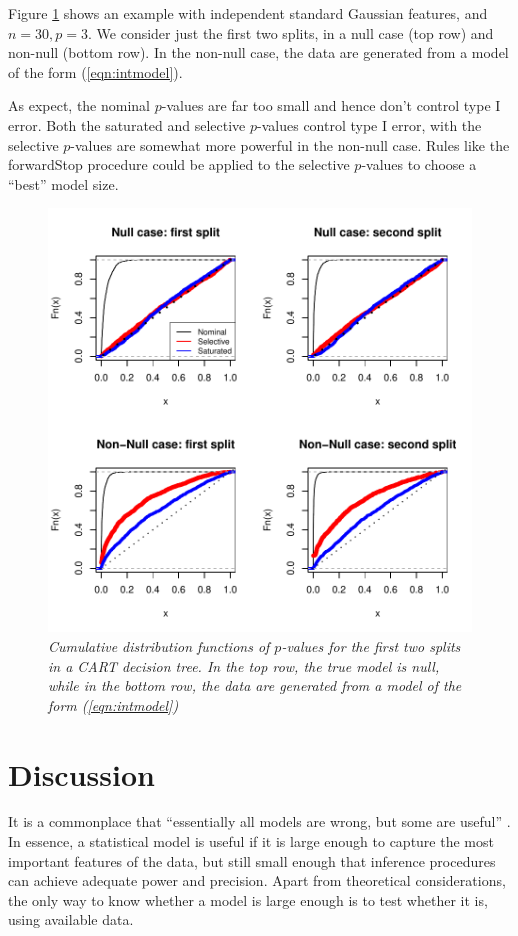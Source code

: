 \documentclass{article}
\begin{document}
Figure \ref{fig:cart} shows an example with independent standard Gaussian features, and $n=30, p=3$.
We 
consider just the first two splits, in a null case (top row) and non-null (bottom row).
In the non-null case,  the data are generated from a  model of the form (\ref{eqn:intmodel}).

As expect, the nominal $p$-values are far too small and hence don't control type I error.
Both the saturated and selective $p$-values control type I error, with the selective $p$-values are somewhat more powerful in the non-null case.
Rules like the forwardStop procedure could be applied  to the selective $p$-values to choose a ``best'' model size.
\begin{figure}[h]
  \centering
  \includegraphics[width=.65\textwidth]{figs/cart.pdf}
  \caption{\em Cumulative distribution functions of $p$-values for  the first two splits in a CART decision tree. In the top row, the true model is null,
  while in the bottom row, the data are generated from a  model of the form (\ref{eqn:intmodel})}
  \label{fig:cart}
\end{figure}

\section{Discussion}
\label{sec:discussion}


It is a commonplace that ``essentially all models are wrong, but some are useful'' \citep{box1987empirical}. In essence, a statistical model is useful if it is large enough to capture the most important features of the data, but still small enough that inference procedures can achieve adequate power and precision. Apart from theoretical considerations, the only way to know whether a model is large enough is to test whether it is, using available data.
\end{document}
